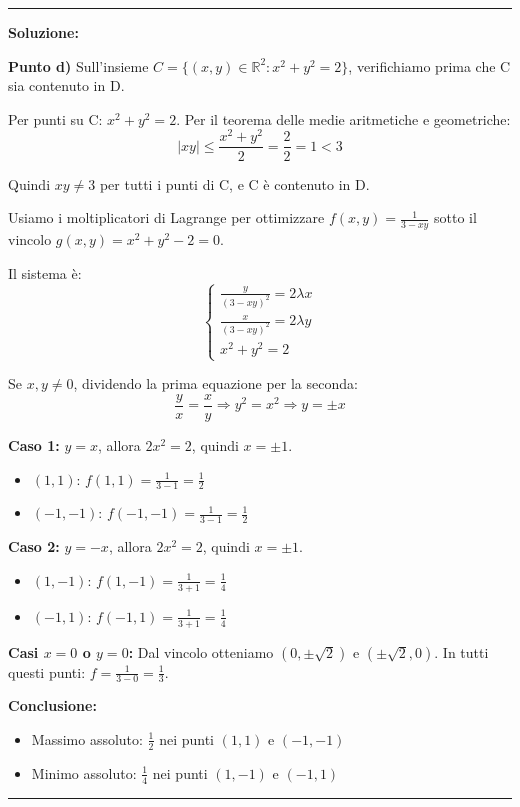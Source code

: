 \documentclass[12pt, a4paper]{article}
\newenvironment{solution}
{\par\noindent\rule{\textwidth}{0.4pt}\par\textbf{Soluzione:}\medskip\par}
{\par\rule{\textwidth}{0.4pt}\par\bigskip}
\begin{document}
\begin{solution}
\vspace{0.5cm}

\textbf{Punto d)} Sull'insieme $C = \{(x,y) \in \mathbb{R}^2 : x^2 + y^2 = 2\}$, verifichiamo prima che C sia contenuto in D.

Per punti su C: $x^2 + y^2 = 2$. Per il teorema delle medie aritmetiche e geometriche:
\[
|xy| \leq \frac{x^2 + y^2}{2} = \frac{2}{2} = 1 < 3
\]

Quindi $xy \neq 3$ per tutti i punti di C, e C è contenuto in D.

Usiamo i moltiplicatori di Lagrange per ottimizzare $f(x,y) = \frac{1}{3-xy}$ sotto il vincolo $g(x,y) = x^2 + y^2 - 2 = 0$.

Il sistema è:
\[
\begin{cases}
\frac{y}{(3-xy)^2} = 2\lambda x \\
\frac{x}{(3-xy)^2} = 2\lambda y \\
x^2 + y^2 = 2
\end{cases}
\]

Se $x, y \neq 0$, dividendo la prima equazione per la seconda:
\[
\frac{y}{x} = \frac{x}{y} \Rightarrow y^2 = x^2 \Rightarrow y = \pm x
\]

\textbf{Caso 1:} $y = x$, allora $2x^2 = 2$, quindi $x = \pm 1$.
\begin{itemize}
    \item $(1, 1)$: $f(1, 1) = \frac{1}{3-1} = \frac{1}{2}$
    \item $(-1, -1)$: $f(-1, -1) = \frac{1}{3-1} = \frac{1}{2}$
\end{itemize}

\textbf{Caso 2:} $y = -x$, allora $2x^2 = 2$, quindi $x = \pm 1$.
\begin{itemize}
    \item $(1, -1)$: $f(1, -1) = \frac{1}{3+1} = \frac{1}{4}$
    \item $(-1, 1)$: $f(-1, 1) = \frac{1}{3+1} = \frac{1}{4}$
\end{itemize}

\textbf{Casi $x = 0$ o $y = 0$:} Dal vincolo otteniamo $(0, \pm\sqrt{2})$ e $(\pm\sqrt{2}, 0)$.
In tutti questi punti: $f = \frac{1}{3-0} = \frac{1}{3}$.

\textbf{Conclusione:}
\begin{itemize}
    \item Massimo assoluto: $\frac{1}{2}$ nei punti $(1, 1)$ e $(-1, -1)$
    \item Minimo assoluto: $\frac{1}{4}$ nei punti $(1, -1)$ e $(-1, 1)$
\end{itemize}
\end{solution}
\end{document}
